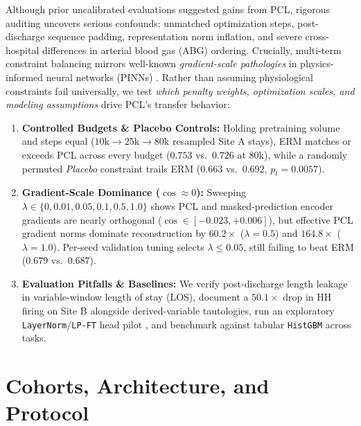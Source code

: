 \documentclass[10pt,twocolumn]{article}
\begin{document}
Although prior uncalibrated evaluations suggested gains from PCL, rigorous auditing uncovers serious confounds: unmatched optimization steps, post-discharge sequence padding, representation norm inflation, and severe cross-hospital differences in arterial blood gas (ABG) ordering. Crucially, multi-term constraint balancing mirrors well-known \emph{gradient-scale pathologies} in physics-informed neural networks (PINNs) \cite{wang2021understanding,krishnapriyan2021characterizing}. Rather than assuming physiological constraints fail universally, we test \emph{which penalty weights, optimization scales, and modeling assumptions} drive PCL's transfer behavior:
\begin{enumerate}
    \item \textbf{Controlled Budgets \& Placebo Controls:} Holding pretraining volume and steps equal ($10\text{k} \to 25\text{k} \to 80\text{k}$ resampled Site A stays), ERM matches or exceeds PCL across every budget ($0.753$ vs.\ $0.726$ at 80k), while a randomly permuted \textit{Placebo} constraint trails ERM ($0.663$ vs.\ $0.692$, $p_t = 0.0057$).
    \item \textbf{Gradient-Scale Dominance ($\cos \approx 0$):} Sweeping $\lambda \in \{0, 0.01, 0.05, 0.1, 0.5, 1.0\}$ shows PCL and masked-prediction encoder gradients are nearly orthogonal ($\cos \in [-0.023, +0.006]$), but effective PCL gradient norms dominate reconstruction by $60.2\times$ ($\lambda=0.5$) and $164.8\times$ ($\lambda=1.0$). Per-seed validation tuning selects $\lambda \le 0.05$, still failing to beat ERM ($0.679$ vs.\ $0.687$).
    \item \textbf{Evaluation Pitfalls \& Baselines:} We verify post-discharge length leakage in variable-window length of stay (LOS), document a $50.1\times$ drop in HH firing on Site B alongside derived-variable tautologies, run an exploratory \texttt{LayerNorm}/\texttt{LP-FT} head pilot \cite{kumar2022fine}, and benchmark against tabular \texttt{HistGBM} across tasks.
\end{enumerate}

\section{Cohorts, Architecture, and Protocol}
\end{document}
